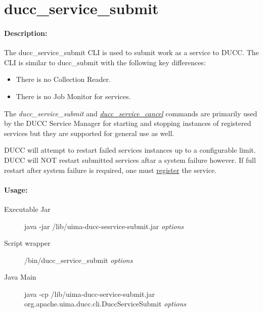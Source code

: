 % 
% 
% 
% 
\ifpdf
\else
{}
\fi
    \section{ducc\_service\_submit}
    \label{sec:cli.service-submit}
    \paragraph{Description:}
    The ducc\_service\_submit CLI is used to submit work as a service to DUCC. The CLI is similar to
    ducc\_submit with the following key differences:
    
    \begin{itemize}
        \item There is no Collection Reader. 
        \item There is no Job Monitor  for services.
    \end{itemize}
        
    The {\em ducc\_service\_submit} and \hyperref[sec:cli.service-cancel]{{\em
        ducc\_service\_cancel}} commands are primarily used by the DUCC Service Manager for starting
    and stopping instances of registered services but they are supported for general use as well.

    DUCC will attempt to restart failed services instances up to a configurable limit.  DUCC will
    NOT restart submitted services aftar a system failure however.  If full restart after system
    failure is required, one must \hyperref[subsec:cli.ducc-services.register]{register} the
    service.
 

    \paragraph{Usage:}
    \begin{description}
    \item[Executable Jar] java -jar \ducchome/lib/uima-ducc-sesrvice-submit.jar {\em options}
    \item[Script wrapper] \ducchome/bin/ducc\_service\_submit {\em options}
    \item[Java Main]      java -cp \ducchome/lib/uima-ducc-service-submit.jar org.apache.uima.ducc.cli.DuccServiceSubmit {\em options}
    \end{description}

